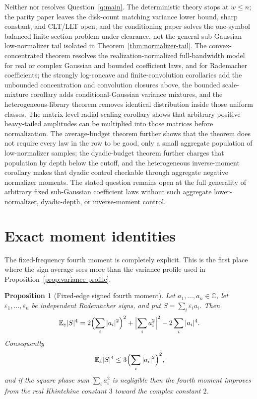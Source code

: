 \documentclass[11pt]{amsart}
\numberwithin{equation}{section}
\newtheorem{proposition}[theorem]{Proposition}
\theoremstyle{definition}
\theoremstyle{remark}
\newcommand{\C}{\mathbb C}
\newcommand{\Exp}{\mathbb E}
\newcommand{\eps}{\varepsilon}
\begin{document}
Neither \cite{Shmalo-paper5} nor \cite{Shmalo-paper16} resolves
Question~\ref{q:main}. The deterministic theory stops at \(w\le n\); the
parity paper leaves the disk-count matching variance lower bound, sharp
constant, and CLT/LLT open; and the conditioning paper solves the one-symbol
balanced finite-section problem under clearance, not the general sub-Gaussian
low-normalizer tail isolated in Theorem~\ref{thm:normalizer-tail}. The
convex-concentrated theorem resolves the realization-normalized full-bandwidth
model for real or complex Gaussian and bounded coefficient laws, and for
Rademacher coefficients; the strongly log-concave and finite-convolution
corollaries add the unbounded concentration and convolution closures above, the
bounded scale-mixture corollary adds conditional-Gaussian variance mixtures, and
the heterogeneous-library theorem removes identical distribution inside those
uniform classes.  The matrix-level radial-scaling corollary shows that arbitrary
positive heavy-tailed amplitudes can be multiplied into those matrices before
normalization.  The average-budget theorem further shows that the theorem does
not require every law in the row to be good, only a small aggregate population of
low-normalizer samples; the dyadic-budget theorem further charges that
population by depth below the cutoff, and the heterogeneous inverse-moment
corollary makes that dyadic control checkable through aggregate negative
normalizer moments.  The stated question remains open at the full generality of
arbitrary fixed sub-Gaussian coefficient laws without such aggregate
lower-normalizer, dyadic-depth, or inverse-moment control.

\section{Exact moment identities}\label{sec:moments}

The fixed-frequency fourth moment is completely explicit.  This is the first
place where the sign average sees more than the variance profile used in
Proposition~\ref{prop:variance-profile}.

\begin{proposition}[Fixed-edge signed fourth moment]
\label{prop:fixed-edge-fourth}
Let \(a_1,\ldots,a_n\in\C\), let \(\eps_1,\ldots,\eps_n\) be independent
Rademacher signs, and put \(S=\sum_i\eps_i a_i\).  Then
\[
  \Exp_\eps |S|^4
  =
  2\Bigl(\sum_i |a_i|^2\Bigr)^2
  +\Bigl|\sum_i a_i^2\Bigr|^2
  -2\sum_i |a_i|^4 .
\]
Consequently
\[
  \Exp_\eps |S|^4\le
  3\Bigl(\sum_i |a_i|^2\Bigr)^2 ,
\]
and if the square phase sum \(\sum_i a_i^2\) is negligible then the fourth
moment improves from the real Khintchine constant \(3\) toward the complex
constant \(2\).
\end{proposition}
\end{document}
